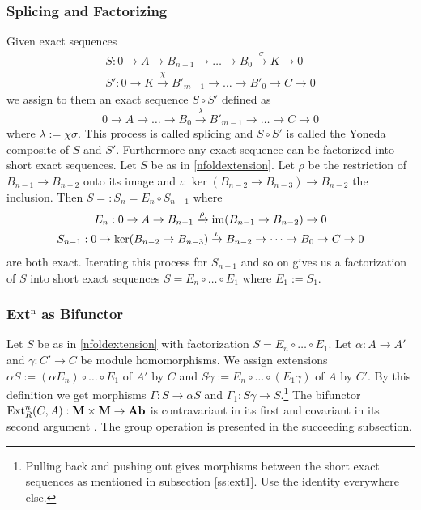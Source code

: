 \subsubsection{Splicing and Factorizing}
Given exact sequences
\begin{gather*}
S :0 \to A \to B_{n-1}\to \dots\to B_0 \xrightarrow{\sigma} K \to 0
\\
S': 0 \to K \xrightarrow{\chi} B'_{m-1}\to \dots \to B'_0 \to C \to 0
\end{gather*}
we assign to them an exact sequence $S \circ S'$ defined as
\begin{equation*} 
\label{diag:factorize} 
0 \to A \to \dots \to B_0 \xrightarrow{\lambda} B'_{m-1} \to \dots \to C \to 0
\end{equation*}
where $\lambda := \chi\sigma$.
This process is called splicing and $S\circ S'$ is called the Yoneda composite of $S$ and $S'$.
Furthermore any exact sequence can be factorized into short exact sequences.
Let $S$ be as in \eqref{nfoldextension}.
Let $\rho$ be the restriction of $B_{n-1}\to B_{n-2}$ onto its image and $\iota: \ker(B_{n-2} \to B_{n-3}) \to B_{n-2}$ the inclusion.
Then $S =: S_n = E_n \circ S_{n-1}$ where
\begin{gather*}
E_n : 0 \to A \to B_{n-1} \xrightarrow{\rho}\operatorname{im}(B_{n-1}\to B_{n-2}) \to 0 
\\
S_{n-1} : 0 \to {\ker(B_{n-2} \to B_{n-3})} \xrightarrow{\iota}B_{n-2} \to \dots \to B_0 \to C \to 0
\end{gather*}
are both exact.
Iterating this process for $S_{n-1}$ and so on gives us a factorization of $S$ into short exact sequences $S=E_n \circ \dots \circ E_1$ where $E_1 := S_1$.
\subsubsection{Ext$^{\text{n}}$ as Bifunctor}
\label{ss:extnasbifunctor}
Let $S$ be as in \eqref{nfoldextension} with factorization $S=E_n 
\circ \dots \circ E_1$.
Let $\alpha: A\to A'$ and $\gamma: C' \to C$ be module homomorphisms.
We assign extensions $\alpha S := (\alpha E_n) \circ \dots \circ E_1$ of $A'$ by $C$ and $S\gamma := E_n \circ \dots \circ (E_1 \gamma)$ of $A$ by $C'$.
By this definition we get morphisms $\Gamma: S\to \alpha S$ and $\Gamma_1: S\gamma \to S $.\footnote{Pulling back and pushing out gives morphisms between the short exact sequences as mentioned in subsection \ref{ss:ext1}. Use the identity everywhere else.}
The bifunctor $\operatorname{Ext}^{n}_{R}(C,A): \mathbf{M \times M} \to \mathbf {Ab}$ is contravariant in its first and covariant in its second argument \cite[p. 85]{maclane}.
The group operation is presented in the succeeding subsection.

